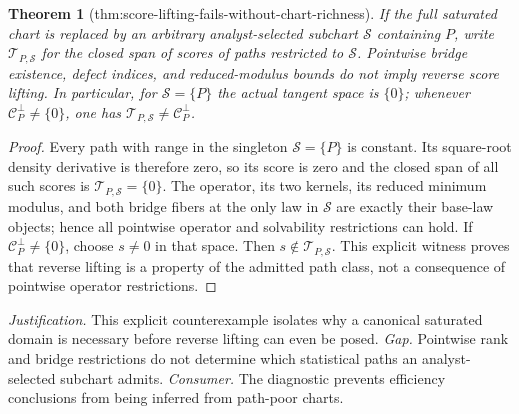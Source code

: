 \documentclass{article}
\newtheorem{theorem}{Theorem}
\begin{document}
\begin{theorem}[thm:score-lifting-fails-without-chart-richness]\label{thm:score-lifting-fails-without-chart-richness}
If the full saturated chart is replaced by an arbitrary analyst-selected subchart \(\mathcal S\) containing \(P\), write \(\mathcal T_{P,\mathcal S}\) for the closed span of scores of paths restricted to \(\mathcal S\). Pointwise bridge existence, defect indices, and reduced-modulus bounds do not imply reverse score lifting. In particular, for \(\mathcal S=\{P\}\) the actual tangent space is \(\{0\}\); whenever \(\mathcal C_P^\perp\ne\{0\}\), one has \(\mathcal T_{P,\mathcal S}\ne\mathcal C_P^\perp\).
\end{theorem}
\begin{proof}
Every path with range in the singleton \(\mathcal S=\{P\}\) is constant.  Its square-root density derivative is therefore zero, so its score is zero and the closed span of all such scores is \(\mathcal T_{P,\mathcal S}=\{0\}\).  The operator, its two kernels, its reduced minimum modulus, and both bridge fibers at the only law in \(\mathcal S\) are exactly their base-law objects; hence all pointwise operator and solvability restrictions can hold.  If \(\mathcal C_P^\perp\ne\{0\}\), choose \(s\ne0\) in that space.  Then \(s\notin\mathcal T_{P,\mathcal S}\).  This explicit witness proves that reverse lifting is a property of the admitted path class, not a consequence of pointwise operator restrictions.
\end{proof}
\par\smallskip\noindent \textit{Justification.} This explicit counterexample isolates why a canonical saturated domain is necessary before reverse lifting can even be posed. \textit{Gap.} Pointwise rank and bridge restrictions do not determine which statistical paths an analyst-selected subchart admits. \textit{Consumer.} The diagnostic prevents efficiency conclusions from being inferred from path-poor charts.
\end{document}
